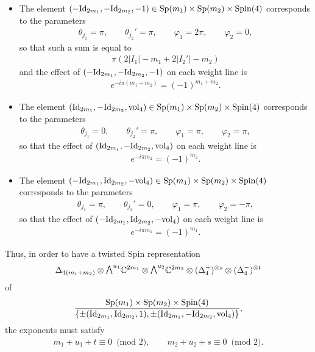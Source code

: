 \documentclass[10pt,a4paper]{amsart}
\newcommand{\ext}{\raise1pt\hbox{$\textstyle\bigwedge$}}
\numberwithin{equation}{section}
\begin{document}
\begin{itemize}\itemsep=0pt
\item The element $(-{\rm Id}_{2m_1},-{\rm Id}_{2m_2},-1)\in {\rm Sp}(m_1)\times {\rm Sp}(m_2)\times {\rm Spin}(4)$ corresponds to the parameters
\begin{gather*}
 \theta_{j_1} = \pi , \qquad \theta_{j_2}' = \pi , \qquad \varphi_1 = 2\pi,\qquad \varphi_2 = 0,
\end{gather*}
so that such a sum is equal to
\begin{gather*}\pi(2|I_1| - m_1 + 2|I_2'|-m_2) \end{gather*}
and the ef\/fect of $(-{\rm Id}_{2m_1},-{\rm Id}_{2m_2},-1)$ on each weight line is
\begin{gather*}e^{-i\pi(m_1+m_2)} = (-1)^{m_1+m_2}.
\end{gather*}

\item The element $({\rm Id}_{2m_1},-{\rm Id}_{2m_2},{\rm vol}_4)\in {\rm Sp}(m_1)\times {\rm Sp}(m_2)\times {\rm Spin}(4)$ corresponds to the parameters
\begin{gather*}
 \theta_{j_1} = 0 , \qquad \theta_{j_2}' = \pi , \qquad \varphi_1 = \pi,\qquad \varphi_2 = \pi,
\end{gather*}
so that the ef\/fect of $({\rm Id}_{2m_1},-{\rm Id}_{2m_2},{\rm vol}_4)$ on each weight line is
\begin{gather*}e^{-i\pi m_2} = (-1)^{m_2}.
\end{gather*}

\item The element $(-{\rm Id}_{2m_1},{\rm Id}_{2m_2},-{\rm vol}_4)\in {\rm Sp}(m_1)\times {\rm Sp}(m_2)\times {\rm Spin}(4)$ corresponds to the parameters
\begin{gather*}
 \theta_{j_1} = \pi , \qquad \theta_{j_2}' = 0 , \qquad \varphi_1 = \pi,\qquad
 \varphi_2 = -\pi,
\end{gather*}
so that the ef\/fect of $(-{\rm Id}_{2m_1},{\rm Id}_{2m_2},-{\rm vol}_4)$ on each weight line is
\begin{gather*}e^{-i\pi m_1} = (-1)^{m_1}.
\end{gather*}
\end{itemize}

Thus, in order to have a twisted Spin representation
\begin{gather*}\Delta_{4(m_1+m_2)}\otimes \ext^{u_1} \mathbb{C}^{2m_1}\otimes \ext^{u_2} \mathbb{C}^{2m_2}\otimes (\Delta_4^+)^{\otimes s}\otimes (\Delta_4^-)^{\otimes t}\end{gather*}
of \begin{gather*}{{\rm Sp}(m_1)\times {\rm Sp}(m_2)\times {\rm Spin}(4)\over \{\pm ({\rm Id}_{2m_1},{\rm Id}_{2m_2},1),\pm ({\rm Id}_{2m_1},-{\rm Id}_{2m_2},{\rm vol}_4)\}},\end{gather*} the exponents must satisfy
\begin{gather*}
m_1+u_1+t \equiv 0\,\,\,\mbox{(mod 2)} ,\qquad m_2+u_2+s \equiv 0\,\,\,\mbox{(mod 2)} .
\end{gather*}
\end{document}

